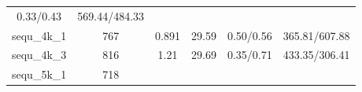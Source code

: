 \documentclass[]{article}
\begin{document}
\begin{longtable}[]{@{}cccccc@{}}
\begin{minipage}[t]{0.17\columnwidth}
0.33/0.43\strut
\end{minipage} & \begin{minipage}[t]{0.22\columnwidth}\centering\strut
569.44/484.33\strut
\end{minipage}\tabularnewline
\begin{minipage}[t]{0.12\columnwidth}\centering\strut
sequ\_4k\_1\strut
\end{minipage} & \begin{minipage}[t]{0.07\columnwidth}\centering\strut
767\strut
\end{minipage} & \begin{minipage}[t]{0.12\columnwidth}\centering\strut
0.891\strut
\end{minipage} & \begin{minipage}[t]{0.14\columnwidth}\centering\strut
29.59\strut
\end{minipage} & \begin{minipage}[t]{0.17\columnwidth}\centering\strut
0.50/0.56\strut
\end{minipage} & \begin{minipage}[t]{0.22\columnwidth}\centering\strut
365.81/607.88\strut
\end{minipage}\tabularnewline
\begin{minipage}[t]{0.12\columnwidth}\centering\strut
sequ\_4k\_3\strut
\end{minipage} & \begin{minipage}[t]{0.07\columnwidth}\centering\strut
816\strut
\end{minipage} & \begin{minipage}[t]{0.12\columnwidth}\centering\strut
1.21\strut
\end{minipage} & \begin{minipage}[t]{0.14\columnwidth}\centering\strut
29.69\strut
\end{minipage} & \begin{minipage}[t]{0.17\columnwidth}\centering\strut
0.35/0.71\strut
\end{minipage} & \begin{minipage}[t]{0.22\columnwidth}\centering\strut
433.35/306.41\strut
\end{minipage}\tabularnewline
\begin{minipage}[t]{0.12\columnwidth}\centering\strut
sequ\_5k\_1\strut
\end{minipage} & \begin{minipage}[t]{0.07\columnwidth}\centering\strut
718\strut
\end{minipage} & \begin{minipage}[t]{0.12\columnwidth}\centering\strut

\end{minipage}
\end{longtable}
\end{document}
